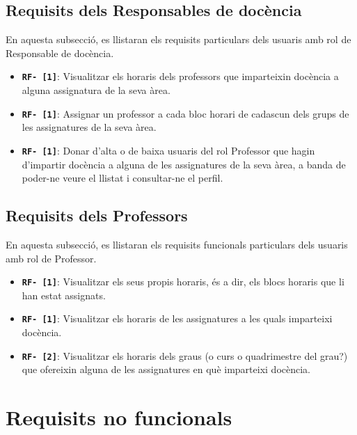 \documentclass[a4paper,12pt]{ThesisStyle}
\begin{document}
\subsection{Requisits dels Responsables de docència} %
\label{subsec:requisits_responsables_docencia}

En aquesta subsecció, es llistaran els requisits particulars dels usuaris amb rol de Responsable de docència.

\begin{itemize} %
  \item \texttt{\textbf{RF- [1]}}: Visualitzar els horaris dels professors que imparteixin docència a alguna assignatura de la seva àrea.
  \item \texttt{\textbf{RF- [1]}}: Assignar un professor a cada bloc horari de cadascun dels grups de les assignatures de la seva àrea.
  \item \texttt{\textbf{RF- [1]}}: Donar d'alta o de baixa usuaris del rol Professor que hagin d'impartir docència a alguna de les assignatures de la seva àrea, a banda de poder-ne veure el llistat i consultar-ne el perfil.
\end{itemize}

\subsection{Requisits dels Professors}
\label{subsec:requisits_professors}

En aquesta subsecció, es llistaran els requisits funcionals particulars dels usuaris amb rol de Professor.

\begin{itemize} %
  \item \texttt{\textbf{RF- [1]}}: Visualitzar els seus propis horaris, és a dir, els blocs horaris que li han estat assignats.
  \item \texttt{\textbf{RF- [1]}}: Visualitzar els horaris de les assignatures a les quals imparteixi docència.
  \item \texttt{\textbf{RF- [2]}}: Visualitzar els horaris dels graus (o curs o quadrimestre del grau?) que ofereixin alguna de les assignatures en què imparteixi docència.
\end{itemize}

\section{Requisits no funcionals}
\label{sec:requisits_no_funcionals}
\end{document}
